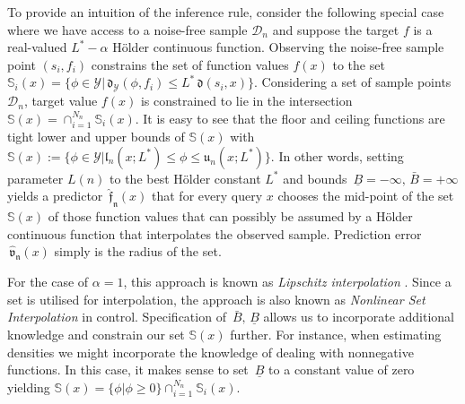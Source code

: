 \documentclass{article} %
\theoremstyle{definition}
\theoremstyle{remark}
\newcommand{\data}{\ensuremath{ \mathcal D} }
\newcommand{\outspace}{\ensuremath{ \mathcal Y}}
\newcommand{\metric}{\, \mathfrak{d}} %
\newcommand{\predfn}{\, \mathfrak{  \hat f_n}} %
\newcommand{\prederrn}{\, \mathfrak{\hat v_n}} %
\newcommand{\hexp}{{ \alpha }}%
\newcommand{\ubf}{\, {\bar B}} %
\newcommand{\lbf}{\, {\underline{B}}} %
\newcommand{\decke}{\ensuremath{\mathfrak u}}
\newcommand{\boden}{\ensuremath{\mathfrak l}}
\begin{document}
To provide an intuition of the inference rule, consider the following special case where we have access to a noise-free sample $\data_n$ and suppose 
the target $f$ is a real-valued $L^*-\hexp$ H\"older continuous function. Observing the noise-free sample point $(s_i,f_i)$ constrains the set of function values $f(x)$ to the set $\mathbb S_i(x) =\{ \phi \in \outspace | \metric_\outspace(\phi, f_i) \leq L^* \metric(s_i,x) \}$. Considering a set of sample points $\data_n$, target value $f(x)$ is constrained to lie in the intersection $\mathbb S(x)=\cap_{i=1}^{N_n} \mathbb S_i(x)$. It is easy to see that the floor and ceiling functions are tight lower and upper bounds of $\mathbb S(x)$ with $\mathbb S(x) := \{ \phi \in \outspace | \boden_n(x; L^*) \leq \phi \leq \decke_n(x;L^*)\}$. In other words, setting parameter $L(n)$ to the best H\"older constant $L^*$ and bounds $\lbf =-\infty,\ubf=+\infty$ yields a predictor $\predfn(x)$ that for every query $x$ chooses the mid-point of the set $\mathbb S(x)$ of those function values that can possibly be assumed by a H\"older continuous function that interpolates the observed sample. Prediction error $\prederrn(x)$ simply is the radius of the set.

For the case of $\hexp=1$, this approach is known as \emph{Lipschitz interpolation} \cite{Beliakov2006,Zabinsky2003}. Since a set is utilised for interpolation, the approach is also known as \emph{Nonlinear Set Interpolation} \cite{Milanese2004,Canale2014} in control. Specification of $\ubf,\lbf$ allows us to incorporate additional knowledge and constrain our set $\mathbb S(x)$ further. 
For instance, when estimating densities we might incorporate the knowledge of dealing with nonnegative functions. In this case, it makes sense to set $\lbf$ to a constant value of zero yielding $\mathbb S(x) = \{\phi | \phi \geq 0 \} \cap_{i=1}^{N_n} \mathbb S_i(x) $.
\end{document}
